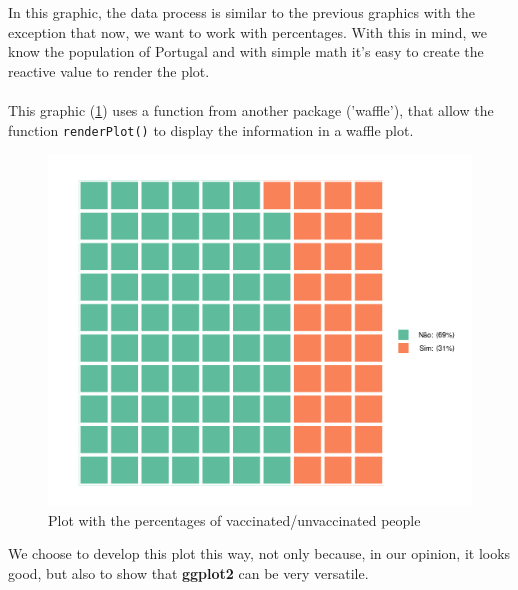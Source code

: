 In this graphic, the data process is similar to the previous graphics with the exception that now, we want to work with percentages. With this in mind, we know the population of Portugal and with simple math it's easy to create the reactive value to render the plot.\\
\\
This graphic (\ref{fig:ages-vac-6}) uses a function from another package ('waffle'), that allow the function \texttt{renderPlot()} to display the information in a waffle plot. 
\begin{figure}[H]
\centering
\includegraphics[width=350pt,trim=10 0 0 -10mm]{images/p6.png}
\caption{Plot with the percentages of vaccinated/unvaccinated people}
\label{fig:ages-vac-6}
\end{figure}
We choose to develop this plot this way, not only because, in our opinion, it looks good, but also to show that \textbf{ggplot2} can be very versatile.